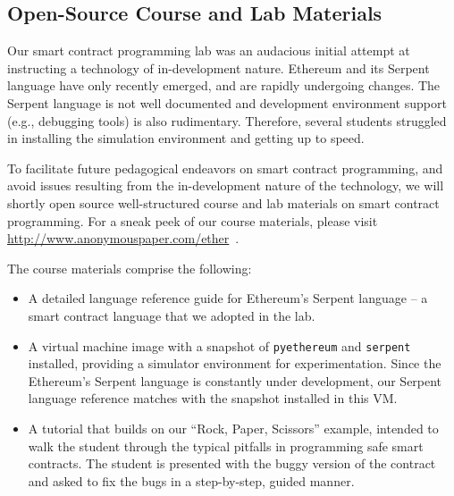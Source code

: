 \documentclass[10pt,twocolumn,letterpaper]{article}
\newcommand{\elaine}[1]{}
\begin{document}
\subsection{Open-Source Course and Lab Materials}
Our smart contract programming lab was an audacious 
initial attempt 
at instructing a technology of in-development nature.
Ethereum and its Serpent language
have only recently emerged, and are 
rapidly undergoing changes. 
The Serpent language is not well documented and development
environment support (e.g., debugging tools) 
is also rudimentary.
Therefore, several students struggled 
in installing the simulation environment and 
getting up to speed.

To facilitate future pedagogical endeavors on smart contract programming,
and avoid issues resulting from the in-development nature of the technology, 
we will shortly open source well-structured course and lab materials on
smart contract programming.
For a sneak peek of our course 
materials, please visit 
\url{http://www.anonymouspaper.com/ether}~\cite{anonymous}.

The course materials comprise the following:
\begin{itemize}[leftmargin=5mm]
\item
A detailed language reference 
guide for Ethereum's Serpent language -- a
smart contract language that we adopted in the lab.
\item
A virtual machine image with a snapshot of {\tt pyethereum} and {\tt serpent} installed,
providing a simulator environment for experimentation.
Since the Ethereum's Serpent language is constantly
under development, our Serpent language
reference matches with the snapshot installed in this VM. 
\item
A tutorial that 
builds on our ``Rock, Paper, Scissors'' example, 
intended to 
walk the student through the typical pitfalls
in programming safe smart contracts.
The student is presented with the buggy version of the contract
and asked to fix the bugs in a step-by-step, guided manner.
\end{itemize}
\end{document}

